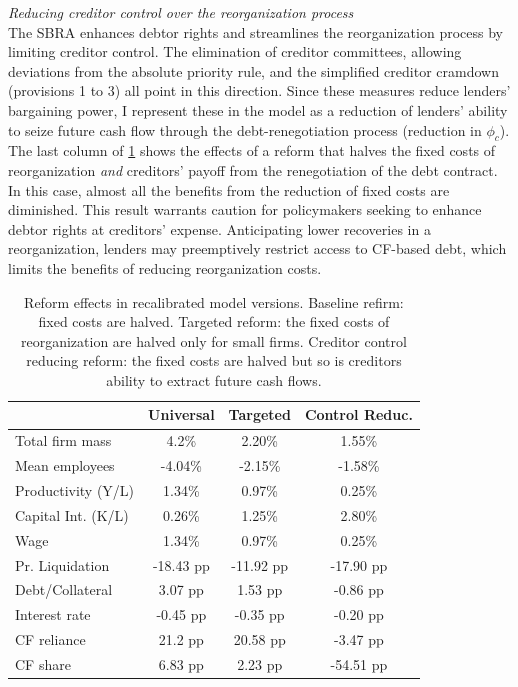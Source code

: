 \documentclass[12pt]{article}
\begin{document}
\noindent \textit{Reducing creditor control over the reorganization process} \\
The SBRA enhances debtor rights and streamlines the reorganization process by limiting creditor control. The elimination of creditor committees, allowing deviations from the absolute priority rule, and the simplified creditor cramdown (provisions 1 to 3) all point in this direction. Since these measures reduce lenders' bargaining power, I represent these in the model as a reduction of lenders' ability to seize future cash flow through the debt-renegotiation process (reduction in $\phi_c$). The last column of \ref{tab:percentage_changes2} shows the effects of a reform that halves the fixed costs of reorganization \textit{and} creditors' payoff from the renegotiation of the debt contract. In this case, almost all the benefits from the reduction of fixed costs are diminished. This result warrants caution for policymakers seeking to enhance debtor rights at creditors' expense. Anticipating lower recoveries in a reorganization, lenders may preemptively restrict access to CF-based debt, which limits the benefits of reducing reorganization costs. 

\begin{table}[H]
    \centering
    \begin{tabular}{lccc}
     & \textbf{Universal} & \textbf{Targeted} & \textbf{Control Reduc.} \\    
    \toprule
    Total firm mass & 4.2\%  & 2.20\% & 1.55\%  \\  
    Mean employees & -4.04\%  & -2.15\% & -1.58\%   \\  
    Productivity (Y/L) & 1.34\%  & 0.97\% & 0.25\%  \\  
    Capital Int. (K/L) & 0.26\%  & 1.25\% & 2.80\%  \\  
    Wage & 1.34\%  & 0.97\% & 0.25\%  \vspace{2mm}  \\  
    Pr. Liquidation & -18.43 pp  & -11.92 pp & -17.90 pp \\  
    Debt/Collateral & 3.07 pp  &  1.53 pp & -0.86 pp  \\  
    Interest rate & -0.45 pp  & -0.35 pp & -0.20 pp  \\  
    CF reliance & 21.2 pp  & 20.58 pp & -3.47 pp  \\    
    CF share & 6.83 pp  & 2.23 pp & -54.51 pp  \\  
    \bottomrule
    \end{tabular}
    \caption{\small Reform effects in recalibrated model versions. Baseline refirm: fixed costs are halved. Targeted reform: the fixed costs of reorganization are halved only for small firms. Creditor control reducing reform: the fixed costs are halved but so is creditors ability to extract future cash flows.}
    \label{tab:percentage_changes2}
\end{table}
\end{document}
